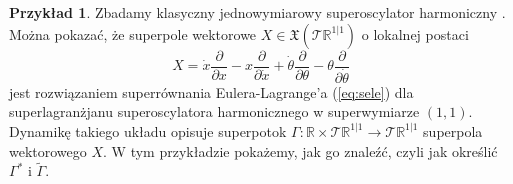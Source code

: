 \documentclass[11pt,a4paper]{report}
\theoremstyle{definition}
\newtheorem{example}[theorem]{Przykład}
\begin{document}
\begin{example}
 Zbadamy klasyczny jednowymiarowy superoscylator harmoniczny \cite{So99}. Można pokazać, że superpole wektorowe $X \in \mathfrak{X}(\mathcal{T}\mathbb{R}^{1|1})$ o lokalnej postaci
 \begin{equation*}
  X = \dot x \frac{\partial}{\partial x} - x \frac{\partial}{\partial \dot x} + \dot \theta \frac{\partial}{\partial \theta} - \theta \frac{\partial}{\partial \dot \theta}
 \end{equation*}
jest rozwiązaniem superrównania Eulera-Lagrange'a (\ref{eq:sele}) dla superlagranżjanu superoscylatora harmonicznego w superwymiarze $(1,1)$. Dynamikę takiego układu opisuje superpotok $\Gamma: \mathbb{R} \times \mathcal{T} \mathbb{R}^{1|1} \rightarrow \mathcal{T} \mathbb{R}^{1|1}$ superpola wektorowego $X$. W tym przykładzie pokażemy, jak go znaleźć, czyli jak określić $\Gamma^*$ i $\widetilde{\Gamma}$.


\end{example}
\end{document}
